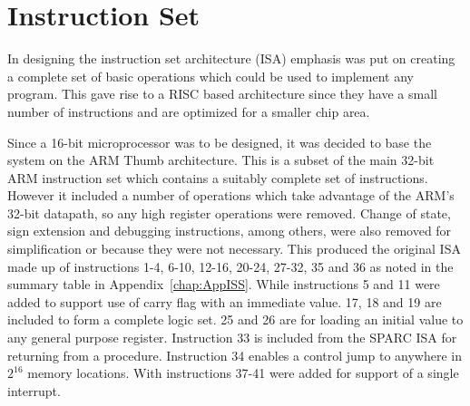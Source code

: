 
\chapter{Instruction Set}

In designing the instruction set architecture (ISA) emphasis was put on creating a complete set of basic operations which could be used to implement any program. This gave rise to a RISC based architecture since they have a small number of instructions and are optimized for a smaller chip area.

Since a 16-bit microprocessor was to be designed, it was decided to base the system on the ARM Thumb architecture. This is a subset of the main 32-bit ARM instruction set which contains a suitably complete set of instructions. However it included a number of operations which take advantage of the ARM's 32-bit datapath, so any high register operations were removed. Change of state, sign extension and debugging instructions, among others, were also removed for simplification or because they were not necessary. This produced the original ISA made up of instructions 1-4, 6-10, 12-16, 20-24, 27-32, 35 and 36 as noted in the summary table in Appendix~\ref{chap:AppISS}. While instructions 5 and 11 were added to support use of carry flag with an immediate value. 17, 18 and 19 are included to form a complete logic set. 25 and 26 are for loading an initial value to any general purpose register. Instruction 33 is included from the SPARC ISA for returning from a procedure. Instruction 34 enables a control jump to anywhere in $2^{16}$ memory locations. With instructions 37-41 were added for support of a single interrupt.

